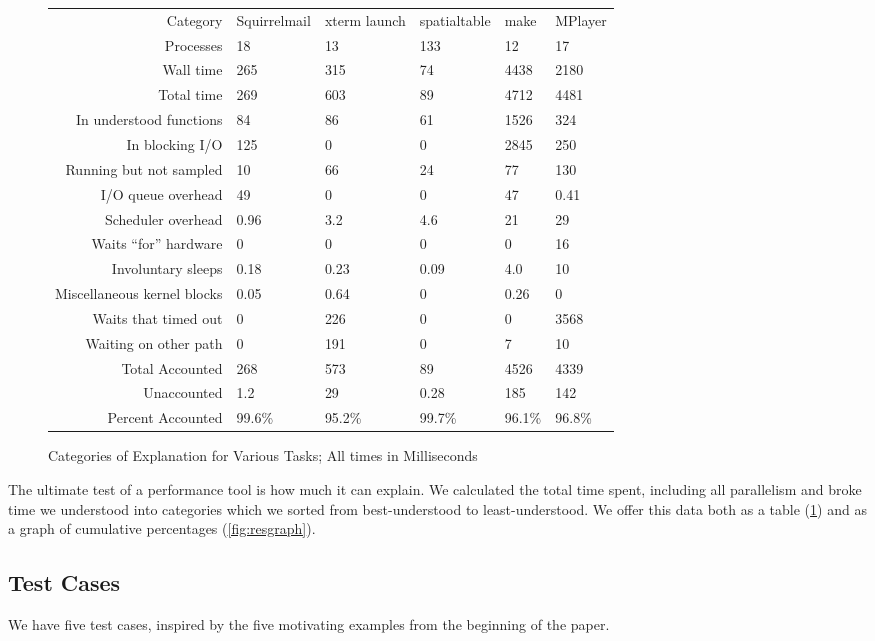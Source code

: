 \documentclass[10pt]{article}
\begin{document}
\begin{figure}[t]
\begin{tabular}{r|C{.77in}C{.8in}C{.77in}C{.77in}C{.77in}}
Category & Squirrelmail & xterm launch & spatialtable & make & MPlayer\\
Processes & 18 & 13 & 133 & 12 & 17\\
\hline
Wall time & 265 & 315 & 74 & 4438 & 2180\\
Total time & 269 & 603 & 89 & 4712 & 4481\\
\hline
In understood functions & 84 & 86 & 61 & 1526 & 324\\
In blocking I/O & 125 & 0 & 0 & 2845 & 250\\
Running but not sampled & 10 & 66 & 24 & 77 & 130\\
I/O queue overhead & 49 & 0 & 0 & 47 & 0.41\\
Scheduler overhead & 0.96 & 3.2 & 4.6 & 21 & 29\\
Waits ``for'' hardware & 0 & 0 & 0 & 0 & 16\\
Involuntary sleeps & 0.18 & 0.23 & 0.09 & 4.0 & 10\\
Miscellaneous kernel blocks & 0.05 & 0.64 & 0 & 0.26 & 0\\
Waits that timed out & 0 & 226 & 0 & 0 & 3568\\
Waiting on other path & 0 & 191 & 0 & 7 & 10\\
\hline
Total Accounted & 268 & 573 & 89 & 4526 & 4339\\
Unaccounted & 1.2 & 29 & 0.28 & 185 & 142\\
Percent Accounted & 99.6\% & 95.2\% & 99.7\% & 96.1\% & 96.8\%\\
\end{tabular}
\caption{Categories of Explanation for Various Tasks; All times in Milliseconds}
\label{fig:restab}
\end{figure}

The ultimate test of a performance tool is how much it can explain.  We calculated the total time spent, including all parallelism and broke time we understood into categories which we sorted from best-understood to least-understood.  We offer this data both as a table (\ref{fig:restab}) and as a graph of cumulative percentages (\ref{fig:resgraph}).

\subsection{Test Cases}

We have five test cases, inspired by the five motivating examples from the beginning of the paper.
\end{document}

